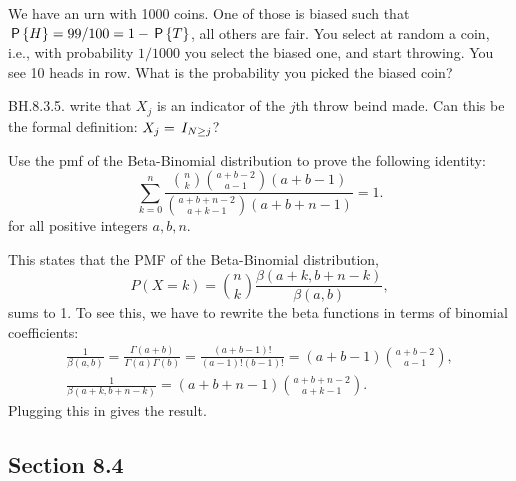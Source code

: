 \begin{exercise}
We have an urn with 1000 coins. One of those is biased such that $\P{H} = 99/100 = 1-\P{T}$, all others are fair. You select at random a coin, i.e., with probability $1/1000$ you select the biased one, and start throwing. You see 10 heads in row. What is the probability you picked the biased coin?
\begin{hint}
\end{hint}
\begin{solution}
\end{solution}
\end{exercise}


\begin{exercise}
BH.8.3.5. write that $X_j$ is an indicator of the $j$th throw beind made. Can this be the formal definition: $X_j = \1{N\geq j}$?
\begin{hint}
\end{hint}
\begin{solution}
\end{solution}
\end{exercise}


\begin{exercise}
Use the pmf of the Beta-Binomial distribution to prove the following identity:
\begin{equation*}
   \sum_{k=0}^n \frac{\binom{n}{k}\binom{a+b-2}{a-1}  (a+b-1) }{\binom{a+b+n-2}{a+k-1}(a+b+n-1)} = 1.
\end{equation*}
for all positive integers $a, b, n$.
\begin{solution}
This  states that the PMF of the Beta-Binomial distribution, $$P(X=k) = \binom{n}{k} \frac{\beta(a+k,b+n-k)}{\beta(a,b)},$$ sums to 1. To see this, we have to rewrite the beta functions in terms of binomial coefficients:
\begin{align*}
   \frac{1}{\beta(a,b)} = \frac{\Gamma(a+b)}{\Gamma(a)\Gamma(b)} = \frac{(a+b-1)!}{(a-1)! (b-1)!} = (a+b-1) \binom{a+b-2}{a-1}, \\
   \frac{1}{\beta(a+k,b+n-k)}  = (a+b+n-1) \binom{a+b+n-2}{a+k-1}.
\end{align*}
Plugging this in gives the result.
\end{solution}
\end{exercise}



\subsection*{Section 8.4}
\label{sec:section-8.4}

